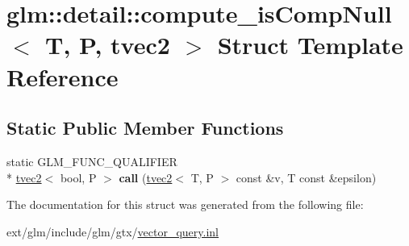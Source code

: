 \hypertarget{structglm_1_1detail_1_1compute__is_comp_null_3_01_t_00_01_p_00_01tvec2_01_4}{\section{glm\-:\-:detail\-:\-:compute\-\_\-is\-Comp\-Null$<$ T, P, tvec2 $>$ Struct Template Reference}
\label{structglm_1_1detail_1_1compute__is_comp_null_3_01_t_00_01_p_00_01tvec2_01_4}
}
\subsection*{Static Public Member Functions}
\begin{DoxyCompactItemize}
\item 
\hypertarget{structglm_1_1detail_1_1compute__is_comp_null_3_01_t_00_01_p_00_01tvec2_01_4_ac0a15e2120dff188297158f1aa716a0e}{static G\-L\-M\-\_\-\-F\-U\-N\-C\-\_\-\-Q\-U\-A\-L\-I\-F\-I\-E\-R \\*
\hyperlink{structglm_1_1tvec2}{tvec2}$<$ bool, P $>$ {\bfseries call} (\hyperlink{structglm_1_1tvec2}{tvec2}$<$ T, P $>$ const \&v, T const \&epsilon)}\label{structglm_1_1detail_1_1compute__is_comp_null_3_01_t_00_01_p_00_01tvec2_01_4_ac0a15e2120dff188297158f1aa716a0e}

\end{DoxyCompactItemize}


The documentation for this struct was generated from the following file\-:\begin{DoxyCompactItemize}
\item 
ext/glm/include/glm/gtx/\hyperlink{vector__query_8inl}{vector\-\_\-query.\-inl}\end{DoxyCompactItemize}
